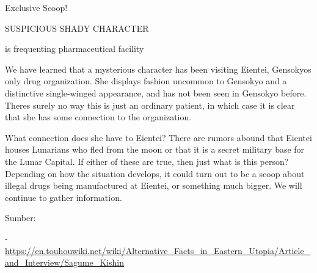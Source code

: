 \begin{tcolorbox}[breakable, colback=white, colframe=black!80,
  boxrule=0.6pt, arc=0mm, left=3mm, right=3mm, top=2mm, bottom=2mm]
\ttfamily\small\raggedright
Exclusive Scoop!\par
SUSPICIOUS SHADY CHARACTER\par
is frequenting pharmaceutical facility\par
\medskip
We have learned that a mysterious character has been visiting Eientei, Gensokyo\textquotesingle{}s only drug organization. She displays fashion uncommon to Gensokyo and a distinctive single-{}winged appearance, and has not been seen in Gensokyo before. There\textquotesingle{}s surely no way this is just an ordinary patient, in which case it is clear that she has some connection to the organization.\par
\medskip
What connection does she have to Eientei? There are rumors abound that Eientei houses Lunarians who fled from the moon or that it is a secret military base for the Lunar Capital. If either of these are true, then just what is this person? Depending on how the situation develops, it could turn out to be a scoop about illegal drugs being manufactured at Eientei, or something much bigger. We will continue to gather information.\par
\bigskip
Sumber:\par
\hspace*{1.5em}- \url{https://en.touhouwiki.net/wiki/Alternative_Facts_in_Eastern_Utopia/Article_and_Interview/Sagume_Kishin}
\end{tcolorbox}
